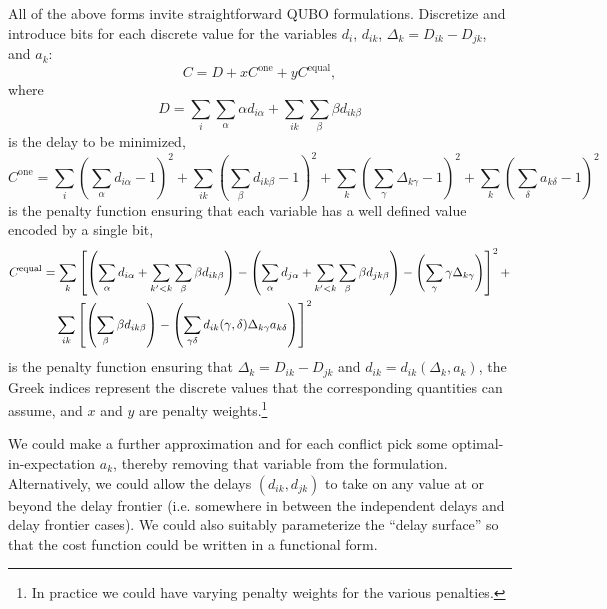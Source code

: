 \documentclass{article}
\begin{document}
All of the above forms invite straightforward QUBO formulations.
Discretize and introduce bits for each discrete value for the variables $d_i$, $d_{ik}$, $\Delta_k = D_{ik} - D_{jk}$, and $a_k$:
\begin{equation*}
    C = D + x C^{\mathrm{one}} + y C^{\mathrm{equal}},
\end{equation*}
where 
\begin{equation*}
D = 
\sum_{i} \sum_{\alpha} \alpha d_{i\alpha}
+
\sum_{ik} \sum_{\beta} \beta d_{ik\beta}
\end{equation*}
is the delay to be minimized,
\begin{equation*}
C^{\mathrm{one}}
=
\sum_i \left(\sum_{\alpha} d_{i\alpha}- 1 \right)^2 
+
\sum_{ik} \left(\sum_{\beta} d_{ik\beta} - 1\right)^2
+
\sum_{k} \left(\sum_{\gamma} \Delta_{k\gamma} - 1\right)^2
+
\sum_{k} \left(\sum_{\delta} a_{k\delta}- 1\right)^2
\end{equation*}
is the penalty function ensuring that each variable has a well defined value encoded by a single bit,
\begin{align*}
C^{\mathrm{equal}}
&=
\sum_{k} \left[
\left(\sum_{\alpha} d_{i\alpha} + \sum_{k' < k} \sum_{\beta} \beta d_{ik\beta}\right)
-
\left(\sum_{\alpha} d_{j\alpha} + \sum_{k' < k} \sum_{\beta} \beta d_{jk\beta}\right)
-
\left(\sum_{\gamma} \gamma \Delta_{k\gamma}\right)\right]^2
+ \\
&\hphantom{=,}
\sum_{ik} \left[
    \left(\sum_{\beta} \beta d_{ik\beta}\right) - 
\left(\sum_{\gamma \delta} d_{ik} (\gamma, \delta) \Delta_{k\gamma} a_{k\delta}\right)\right]^2
\end{align*}
is the penalty function ensuring that $\Delta_k = D_{ik} - D_{jk}$ and $d_{ik} = d_{ik}(\Delta_k, a_k)$, 
the Greek indices represent the discrete values that the corresponding quantities can assume, and $x$ and $y$ are penalty weights.\footnote{In practice we could have varying penalty weights for the various penalties.}

We could make a further approximation and for each conflict pick some optimal-in-expectation $a_k$, thereby removing that variable from the formulation.
Alternatively, we could allow the delays $(d_{ik}, d_{jk})$ to take on any value at or beyond the delay frontier (i.e. somewhere in between the independent delays and delay frontier cases).
We could also suitably parameterize the ``delay surface'' so that the cost function could be written in a functional form.
\end{document}
